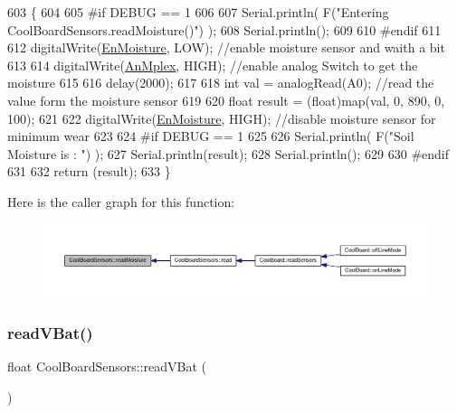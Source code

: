 \begin{DoxyCode}
603 \{
604 
605 \textcolor{preprocessor}{#if DEBUG == 1}
606     
607     Serial.println( F(\textcolor{stringliteral}{"Entering CoolBoardSensors.readMoisture()"}) );
608     Serial.println();
609     
610 \textcolor{preprocessor}{#endif}
611 
612     digitalWrite(\hyperlink{classCoolBoardSensors_a6177d02e14a057a2f171a2e930b5038d}{EnMoisture}, LOW);                 \textcolor{comment}{//enable moisture sensor and waith a bit}
613 
614     digitalWrite(\hyperlink{classCoolBoardSensors_a12ef28b1046219e0aee10bf64e28c4a5}{AnMplex}, HIGH);         \textcolor{comment}{//enable analog Switch to get the moisture}
615 
616     delay(2000);
617 
618     \textcolor{keywordtype}{int} val = analogRead(A0);                       \textcolor{comment}{//read the value form the moisture sensor}
619 
620     \textcolor{keywordtype}{float} result = (float)map(val, 0, 890, 0, 100); 
621 
622     digitalWrite(\hyperlink{classCoolBoardSensors_a6177d02e14a057a2f171a2e930b5038d}{EnMoisture}, HIGH);                  \textcolor{comment}{//disable moisture sensor for minimum wear}
623     
624 \textcolor{preprocessor}{#if DEBUG == 1 }
625 
626     Serial.println( F(\textcolor{stringliteral}{"Soil Moisture is : "}) );
627     Serial.println(result);
628     Serial.println();
629 
630 \textcolor{preprocessor}{#endif }
631 
632     \textcolor{keywordflow}{return} (result);
633 \}
\end{DoxyCode}
Here is the caller graph for this function\+:
\nopagebreak
\begin{figure}[H]
\begin{center}
\leavevmode
\includegraphics[width=350pt]{classCoolBoardSensors_a8761bff50373c485f4465c8db47d0633_icgraph}
\end{center}
\end{figure}
\mbox{\label{classCoolBoardSensors_a6944b6ea7bce8e2fce1b434acfd9d5f3}} 
\subsubsection{\texorpdfstring{read\+V\+Bat()}{readVBat()}}
{\footnotesize\ttfamily float Cool\+Board\+Sensors\+::read\+V\+Bat (\begin{DoxyParamCaption}{ }\end{DoxyParamCaption})}

